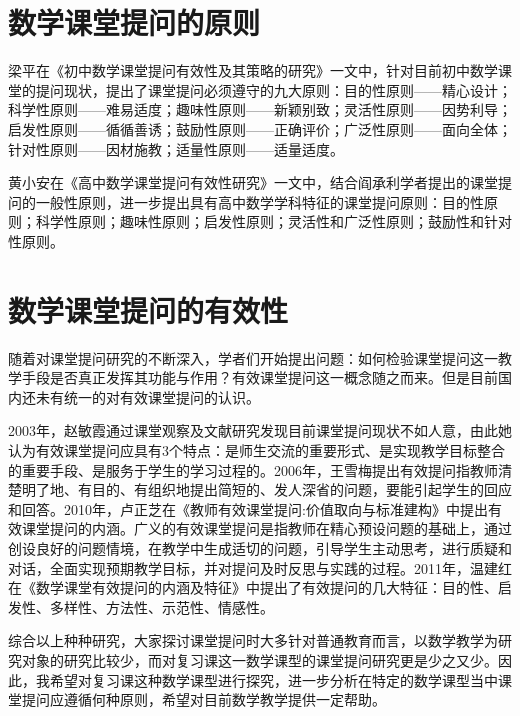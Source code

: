 \section{数学课堂提问的原则}

梁平在《初中数学课堂提问有效性及其策略的研究》一文中，针对目前初中数学课堂的提问现状，提出了课堂提问必须遵守的九大原则：目的性原则——精心设计；科学性原则——难易适度；趣味性原则——新颖别致；灵活性原则——因势利导；启发性原则——循循善诱；鼓励性原则——正确评价；广泛性原则——面向全体；针对性原则——因材施教；适量性原则——适量适度\cite{梁平2011初中数学课堂提问有效性及其策略的研究}。

黄小安在《高中数学课堂提问有效性研究》一文中，结合阎承利学者提出的课堂提问的一般性原则，进一步提出具有高中数学学科特征的课堂提问原则：目的性原则；科学性原则；趣味性原则；启发性原则；灵活性和广泛性原则；鼓励性和针对性原则\cite{黄小安2006高中数学课堂提问有效性研究}。



\section{数学课堂提问的有效性}

随着对课堂提问研究的不断深入，学者们开始提出问题：如何检验课堂提问这一教学手段是否真正发挥其功能与作用？有效课堂提问这一概念随之而来。但是目前国内还未有统一的对有效课堂提问的认识。

2003年，赵敏霞通过课堂观察及文献研究发现目前课堂提问现状不如人意，由此她认为有效课堂提问应具有3个特点：是师生交流的重要形式、是实现教学目标整合的重要手段、是服务于学生的学习过程的\cite{赵敏霞2003对教师有效课堂教学提问的思考}。2006年，王雪梅提出有效提问指教师清楚明了地、有目的、有组织地提出简短的、发人深省的问题，要能引起学生的回应和回答\cite{王雪梅2006课堂提问的有效性及其策略研究}。2010年，卢正芝在《教师有效课堂提问:价值取向与标准建构》中提出有效课堂提问的内涵。广义的有效课堂提问是指教师在精心预设问题的基础上，通过创设良好的问题情境，在教学中生成适切的问题，引导学生主动思考，进行质疑和对话，全面实现预期教学目标，并对提问及时反思与实践的过程\cite{卢正芝2010价值取向与标准建构}。2011年，温建红在《数学课堂有效提问的内涵及特征》中提出了有效提问的几大特征：目的性、启发性、多样性、方法性、示范性、情感性\cite{温建红2011数学课堂有效提问的内涵及特征}。

综合以上种种研究，大家探讨课堂提问时大多针对普通教育而言，以数学教学为研究对象的研究比较少，而对复习课这一数学课型的课堂提问研究更是少之又少。因此，我希望对复习课这种数学课型进行探究，进一步分析在特定的数学课型当中课堂提问应遵循何种原则，希望对目前数学教学提供一定帮助。